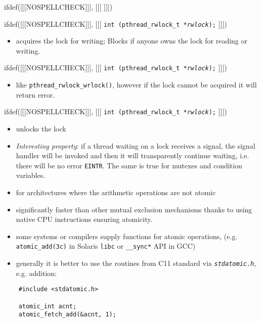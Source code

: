 
ifdef([[[NOSPELLCHECK]]], [[[
]]])

\begin{slide}
\prgchars
ifdef([[[NOSPELLCHECK]]], [[[
\texttt{int (pthread\_rwlock\_t *\emph{rwlock});}
]]])
\begin{itemize}
\item acquires the lock for writing; Blocks if anyone owns the lock for reading
or writing.
\end{itemize}
ifdef([[[NOSPELLCHECK]]], [[[
\texttt{int (pthread\_rwlock\_t *\emph{rwlock});}
]]])
\begin{itemize}
\item like \texttt{pthread\_rwlock\_wrlock()}, however if the lock cannot be
acquired it will return error.
\end{itemize}
ifdef([[[NOSPELLCHECK]]], [[[
\texttt{int (pthread\_rwlock\_t *\emph{rwlock});}
]]])
\begin{itemize}
\item unlocks the lock
\end{itemize}
\end{slide}

\begin{itemize}
\item \emph{Interesting property}: if a thread waiting on a lock receives
a signal, the signal handler will be invoked and then it will transparently
continue waiting, i.e. there will be no error \texttt{EINTR}.
The same is true for mutexes and condition variables.
\end{itemize}



\begin{slide}
\begin{itemize}
\item for architectures where the arithmetic operations are not atomic
\item significantly faster than other mutual exclusion mechanisms
thanks to using native CPU instructions ensuring atomicity.
\item some systems or compilers supply functions for atomic operations,
(e.g. \texttt{atomic\_add(3c)} in Solaris \texttt{libc} or
\texttt{\_\_sync*} API in GCC)
\item generally it is better to use the routines from C11 standard
via \emph{\texttt{stdatomic.h}}, e.g. addition:
\end{itemize}
\begin{verbatim}
    #include <stdatomic.h>

    atomic_int acnt;
    atomic_fetch_add(&acnt, 1);
\end{verbatim}
\end{slide}

